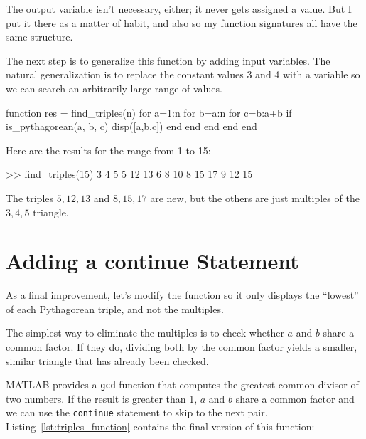 The output variable isn't necessary, either; it
never gets assigned a value.  But I put it there as a matter of
habit, and also so my function signatures all have the same structure.


The next step is to generalize this function by adding input
variables.  The natural generalization is to replace the constant
values 3 and 4 with a variable so we can search an arbitrarily large
range of values.

\begin{code}
function res = find_triples(n)
    for a=1:n
        for b=a:n
            for c=b:a+b
                if is_pythagorean(a, b, c)
                    disp([a,b,c])
                end
            end
        end
    end
end
\end{code}

Here are the results for the range from 1 to 15:

\begin{code}
>> find_triples(15)
     3     4     5
     5    12    13
     6     8    10
     8    15    17
     9    12    15
\end{code}

The triples $5,12,13$ and $8,15,17$ are new, but the others are just multiples of the $3,4,5$ triangle.

\section{Adding a continue Statement}


As a final improvement, let's modify the function so it only
displays the ``lowest'' of each Pythagorean triple, and not the
multiples.

The simplest way to eliminate the multiples is to check whether
$a$ and $b$ share a common factor.  If they do, dividing both
by the common factor yields a smaller, similar triangle that has
already been checked.


MATLAB provides a {\tt gcd} function that computes the greatest common
divisor of two numbers.  If the result is greater than 1,
$a$ and $b$ share a common factor and we can use the {\tt continue}
statement to skip to the next pair. Listing~\ref{lst:triples_function} contains the final version of this function:

